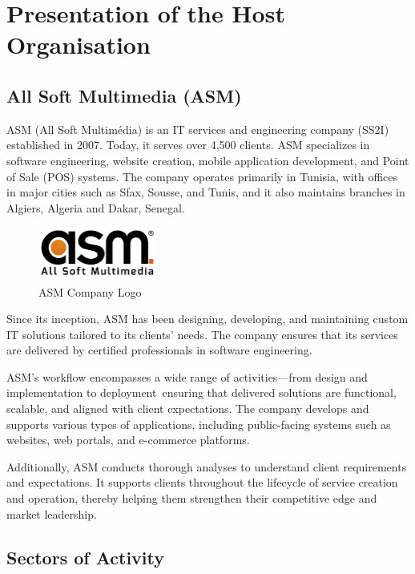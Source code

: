 \section{Presentation of the Host Organisation}

\subsection{All Soft Multimedia (ASM)}

ASM (All Soft Multimédia) is an IT services and engineering company (SS2I) established in 2007. Today, it serves over 4,500 clients. ASM specializes in software engineering, website creation, mobile application development, and Point of Sale (POS) systems. The company operates primarily in Tunisia, with offices in major cities such as Sfax, Sousse, and Tunis, and it also maintains branches in Algiers, Algeria and Dakar, Senegal.

\begin{figure}[H]
    \centering
    \includegraphics[width=0.35\textwidth]{images/asm_logo.png}
    \caption{ASM Company Logo}
    \label{fig:asm_logo}
\end{figure}

Since its inception, ASM has been designing, developing, and maintaining custom IT solutions tailored to its clients' needs. The company ensures that its services are delivered by certified professionals in software engineering.

ASM's workflow encompasses a wide range of activities—from design and implementation to deployment\hspace{0pt}\textemdash\ ensuring that delivered solutions are functional, scalable, and aligned with client expectations. The company develops and supports various types of applications, including public-facing systems such as websites, web portals, and e-commerce platforms.

Additionally, ASM conducts thorough analyses to understand client requirements and expectations. It supports clients throughout the lifecycle of service creation and operation, thereby helping them strengthen their competitive edge and market leadership.

\subsection{Sectors of Activity}

